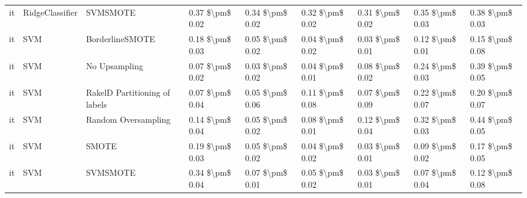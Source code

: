 \begin{tabular}{lllllllll}
      it &                 RidgeClassifier &                      SVMSMOTE &     0.37 \$\textbackslash pm\$ 0.02 &           0.34 \$\textbackslash pm\$ 0.02 &       0.32 \$\textbackslash pm\$ 0.02 &        0.31 \$\textbackslash pm\$ 0.02 &                         0.35 \$\textbackslash pm\$ 0.03 &     0.38 \$\textbackslash pm\$ 0.03 \\
      it &                             SVM &               BorderlineSMOTE &     0.18 \$\textbackslash pm\$ 0.03 &           0.05 \$\textbackslash pm\$ 0.02 &       0.04 \$\textbackslash pm\$ 0.02 &        0.03 \$\textbackslash pm\$ 0.01 &                         0.12 \$\textbackslash pm\$ 0.01 &     0.15 \$\textbackslash pm\$ 0.08 \\
      it &                             SVM &                 No Upsampling &     0.07 \$\textbackslash pm\$ 0.02 &           0.03 \$\textbackslash pm\$ 0.02 &       0.04 \$\textbackslash pm\$ 0.01 &        0.08 \$\textbackslash pm\$ 0.02 &                         0.24 \$\textbackslash pm\$ 0.03 &     0.39 \$\textbackslash pm\$ 0.05 \\
      it &                             SVM & RakelD Partitioning of labels &     0.07 \$\textbackslash pm\$ 0.04 &           0.05 \$\textbackslash pm\$ 0.06 &       0.11 \$\textbackslash pm\$ 0.08 &        0.07 \$\textbackslash pm\$ 0.09 &                         0.22 \$\textbackslash pm\$ 0.07 &     0.20 \$\textbackslash pm\$ 0.07 \\
      it &                             SVM &           Random Oversampling &     0.14 \$\textbackslash pm\$ 0.04 &           0.05 \$\textbackslash pm\$ 0.02 &       0.08 \$\textbackslash pm\$ 0.01 &        0.12 \$\textbackslash pm\$ 0.04 &                         0.32 \$\textbackslash pm\$ 0.03 &     0.44 \$\textbackslash pm\$ 0.05 \\
      it &                             SVM &                         SMOTE &     0.19 \$\textbackslash pm\$ 0.03 &           0.05 \$\textbackslash pm\$ 0.02 &       0.04 \$\textbackslash pm\$ 0.02 &        0.03 \$\textbackslash pm\$ 0.01 &                         0.09 \$\textbackslash pm\$ 0.02 &     0.17 \$\textbackslash pm\$ 0.05 \\
      it &                             SVM &                      SVMSMOTE &     0.34 \$\textbackslash pm\$ 0.04 &           0.07 \$\textbackslash pm\$ 0.01 &       0.05 \$\textbackslash pm\$ 0.02 &        0.03 \$\textbackslash pm\$ 0.01 &                         0.07 \$\textbackslash pm\$ 0.04 &     0.12 \$\textbackslash pm\$ 0.08 \\

\end{tabular}
